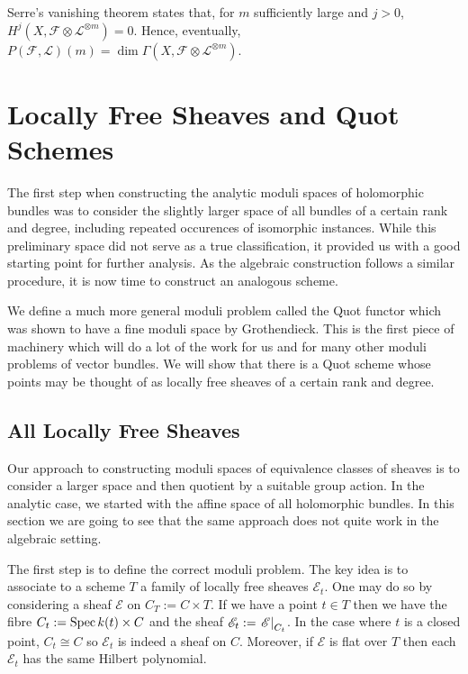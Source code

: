 \documentclass[12pt]{ociamthesis}  %
\begin{document}
Serre's vanishing theorem \missingcitation states that,
for $m$ sufficiently large and $j>0$,
$H^j(X,\mathscr F\otimes\mathscr L^{\otimes m})=0$. Hence,
eventually,
$P(\mathscr F,\mathscr L)(m) = \dim \Gamma(X,\mathscr F\otimes \mathscr L^{\otimes m})$.

\begin{lemma}
\end{lemma}


\missingsection

\section{Locally Free Sheaves and Quot Schemes}

The first step when constructing the analytic moduli spaces of
holomorphic bundles was to consider the slightly larger space of
all bundles of a certain rank and degree, including repeated
occurences of isomorphic instances. While this preliminary space
did not serve as a true
classification,
it provided us with a good starting point for further analysis. As the
algebraic construction follows a similar procedure, it is now
time to construct an analogous scheme.

We define a much more general moduli problem called
the Quot functor which was shown to have a fine moduli space by
Grothendieck. This is the first piece of machinery which will do a
lot of the work for us and for many other moduli problems of vector
bundles. We will show that there is a Quot scheme whose points
may be thought of as locally free sheaves of a certain rank and
degree.

\subsection{All Locally Free Sheaves}

Our approach to constructing moduli spaces of equivalence classes of
sheaves is to consider a larger space and then quotient by a suitable
group action. In the analytic case, we started with the affine space of
all holomorphic bundles. In this section we are going to see that
the same approach does not quite work in the algebraic setting.

The first step is to define the correct moduli problem. The key idea
is to associate to a scheme $T$ a family of locally free sheaves
$\mathscr E_t$. One may do so by considering a sheaf $\mathscr E$ on
$C_T := C\times T$. If we have a point $t\in T$
then we have the fibre $C_t := \operatorname{Spec} k(t) \times C$ and the sheaf
$\mathscr E_t := \left.{\mathscr E}\right\vert_{C_t}$. In the case where
$t$ is a closed point, $C_t \cong C$ so $\mathscr E_t$ is indeed
a sheaf on $C$. Moreover, if $\mathscr E$ is flat over $T$ then
each $\mathscr E_t$ has the same Hilbert polynomial.
\end{document}
